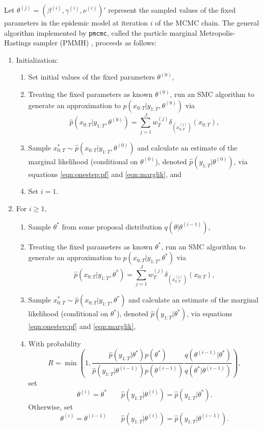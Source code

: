 Let $\theta^{(j)} = \left(\beta^{(i)},\gamma^{(i)},\nu^{(i)}\right)'$ represent the sampled values of the fixed parameters in the epidemic model at iteration $i$ of the MCMC chain. The general algorithm implemented by {\tt pmcmc}, called the particle marginal Metropolis-Hastings sampler (PMMH) \cite[Section 2.4.2][]{Andr:Douc:Hol:pmcmc:2010}, proceeds as follows:
\begin{enumerate}
\item Initialization:
\begin{enumerate}
\item Set initial values of the fixed parameters $\theta^{(0)}$,
\item Treating the fixed parameters as known $\theta^{(0)}$, run an SMC algorithm to generate an approximation to $p(x_{0:T}|y_{1:T},\theta^{(0)})$ via
    \[\hat{p}\left(x_{0:T}|y_{1:T},\theta^{(0)}\right) = \sum_{j=1}^J w_T^{(j)} \delta_{\left(x_{0:T}^{(j)}\right)}(x_{0:T}),\]
\item Sample $x_{0:T}^* \sim \hat{p}\left(x_{0:T}|y_{1:T},\theta^{(0)}\right)$ and calculate an estimate of the marginal likelihood (conditional on $\theta^{(0)}$), denoted $\hat{p}\left(y_{1:T}|\theta^{(0)}\right)$, via equations \eqref{eqn:onestep:pf} and \eqref{eqn:marglik}, and
\item Set $i = 1$.
\end{enumerate}
\item For $i \ge 1$,
\begin{enumerate}
\item Sample $\theta^*$ from some proposal distribution $q(\theta|\theta^{(i-1)})$,
\item Treating the fixed parameters as known $\theta^*$, run an SMC algorithm to generate an approximation to $p(x_{0:T}|y_{1:T},\theta^*)$ via
    \[\hat{p}(x_{0:T}|y_{1:T},\theta^*) = \sum_{j=1}^J w_T^{(j)} \delta_{\left(x_{0:T}^{(j)}\right)}(x_{0:T}),\]
\item Sample $x_{0:T}^* \sim \hat{p}(x_{0:T}|y_{1:T},\theta^*)$ and calculate an estimate of the marginal likelihood (conditional on $\theta^*$), denoted $\hat{p}(y_{1:T}|\theta^*)$, via equations \eqref{eqn:onestep:pf} and \eqref{eqn:marglik},
\item With probability
    \[R = \min\left(1, \frac{\hat{p}(y_{1:T}|\theta^*)p(\theta^*)}{\hat{p}\left(y_{1:T}|\theta^{(i-1)}\right)p\left(\theta^{(i-1)}\right)} \frac{q\left(\theta^{(i-1)}|\theta^*\right)}{q\left(\theta^*|\theta^{(i-1)}\right)} \right),\]
    set
    \[\theta^{(i)} = \theta^* \qquad \hat{p}\left(y_{1:T}|\theta^{(i)}\right) = \hat{p}(y_{1:T}|\theta^*).\]
    Otherwise, set
    \[\theta^{(i)} = \theta^{(i-1)} \qquad \hat{p}\left(y_{1:T}|\theta^{(i)}\right) = \hat{p}\left(y_{1:T}|\theta^{(i-1)}\right).\]
\end{enumerate}
\end{enumerate}

